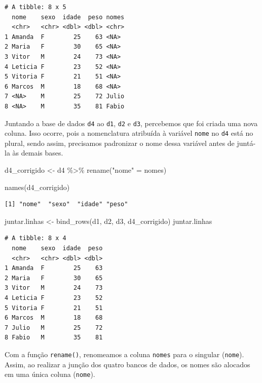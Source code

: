 \documentclass[
  brazilian,
]{book}
\newenvironment{Shaded}{\begin{snugshade}}{\end{snugshade}}
\newcommand{\FunctionTok}[1]{\textcolor[rgb]{0.00,0.00,0.00}{#1}}
\newcommand{\NormalTok}[1]{#1}
\newcommand{\OtherTok}[1]{\textcolor[rgb]{0.56,0.35,0.01}{#1}}
\newcommand{\SpecialCharTok}[1]{\textcolor[rgb]{0.00,0.00,0.00}{#1}}
\newcommand{\StringTok}[1]{\textcolor[rgb]{0.31,0.60,0.02}{#1}}
\begin{document}
\begin{verbatim}
# A tibble: 8 x 5
  nome    sexo  idade  peso nomes
  <chr>   <chr> <dbl> <dbl> <chr>
1 Amanda  F        25    63 <NA> 
2 Maria   F        30    65 <NA> 
3 Vitor   M        24    73 <NA> 
4 Leticia F        23    52 <NA> 
5 Vitoria F        21    51 <NA> 
6 Marcos  M        18    68 <NA> 
7 <NA>    M        25    72 Julio
8 <NA>    M        35    81 Fabio
\end{verbatim}

Juntando a base de dados \texttt{d4} ao \texttt{d1}, \texttt{d2} e \texttt{d3}, percebemos que foi criada uma nova coluna. Isso ocorre, pois a nomenclatura atribuída à variável \texttt{nome} no \texttt{d4} está no plural, sendo assim, precisamos padronizar o nome dessa variável antes de juntá-la às demais bases.

\begin{Shaded}
\begin{Highlighting}[]
\NormalTok{d4\_corrigido }\OtherTok{\textless{}{-}}\NormalTok{ d4 }\SpecialCharTok{\%\textgreater{}\%} 
  \FunctionTok{rename}\NormalTok{(}\StringTok{"nome"} \OtherTok{=}\NormalTok{ nomes)}

\FunctionTok{names}\NormalTok{(d4\_corrigido)}
\end{Highlighting}
\end{Shaded}

\begin{verbatim}
[1] "nome"  "sexo"  "idade" "peso" 
\end{verbatim}

\begin{Shaded}
\begin{Highlighting}[]
\NormalTok{juntar.linhas }\OtherTok{\textless{}{-}} \FunctionTok{bind\_rows}\NormalTok{(d1, d2, d3, d4\_corrigido)}
\NormalTok{juntar.linhas}
\end{Highlighting}
\end{Shaded}

\begin{verbatim}
# A tibble: 8 x 4
  nome    sexo  idade  peso
  <chr>   <chr> <dbl> <dbl>
1 Amanda  F        25    63
2 Maria   F        30    65
3 Vitor   M        24    73
4 Leticia F        23    52
5 Vitoria F        21    51
6 Marcos  M        18    68
7 Julio   M        25    72
8 Fabio   M        35    81
\end{verbatim}

Com a função \texttt{rename()}, renomeamos a coluna \texttt{nomes} para o singular (\texttt{nome}). Assim, ao realizar a junção dos quatro bancos de dados, os nomes são alocados em uma única coluna (\texttt{nome}).
\end{document}
